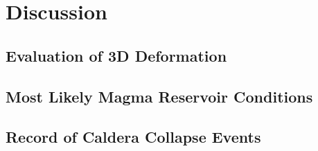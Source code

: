 \chapter{Discussion}
\section{Evaluation of 3D Deformation}
\section{Most Likely Magma Reservoir Conditions}
\section{Record of Caldera Collapse Events}